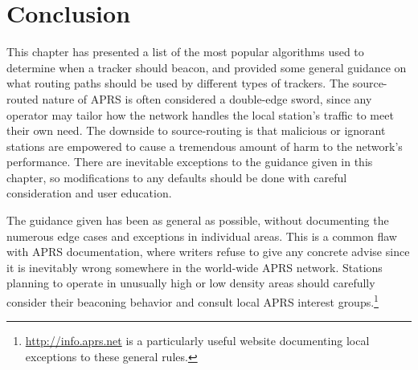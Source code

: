 \section{Conclusion}

This chapter has presented a list of the most popular algorithms
used to determine when a tracker should beacon, and provided some
general guidance on what routing paths should be used by different types
of trackers.
The source-routed nature of APRS is often considered a double-edge sword,
since any operator may tailor how the network
handles the local station's traffic to meet their own need.
The downside to source-routing is that malicious or ignorant stations
are empowered to cause a tremendous amount of harm to the network's performance.
There are inevitable exceptions to the guidance given in this chapter,
so modifications to any defaults should be done with careful consideration
and user education.

The guidance given has been as general as possible,
without documenting the numerous edge cases and exceptions in individual areas.
This is a common flaw with APRS documentation,
where writers refuse to give any concrete advise since it is inevitably wrong
somewhere in the world-wide APRS network.
Stations planning to operate in unusually high or low density areas should
carefully consider their beaconing behavior and consult local APRS interest
groups.\footnote{\url{http://info.aprs.net} is a particularly useful website
documenting local exceptions to these general rules.}
